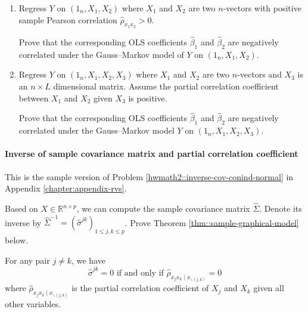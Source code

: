 \begin{enumerate}
\item
Regress $Y$ on $(1_n,X_1, X_2)$ where $X_1$ and $X_2$ are two $n$-vectors with positive sample Pearson correlation $\hat\rho_{x_1x_2} > 0$. 

Prove that the corresponding OLS coefficients $\hat{\beta}_1$ and $\hat{\beta}_2$ are negatively correlated under the Gauss--Markov model of $Y$ on $(1_n,X_1, X_2)$. 

\item
Regress $Y$ on $(1_n,X_1, X_2, X_3)$ where $X_1$ and $X_2$ are two $n$-vectors and $X_3$ is an $n\times L$ dimensional matrix. Assume the partial correlation coefficient between $X_1$ and $X_2$ given $X_3$ is positive.

Prove that the corresponding OLS coefficients $\hat{\beta}_1$ and $\hat{\beta}_2$ are negatively correlated under the Gauss--Markov model $Y$ on $(1_n,X_1, X_2, X_3)$. 
\end{enumerate}




\paragraph{Inverse of sample covariance matrix and partial correlation coefficient}\label{hw::7:inverse-samplecov-pcc}

This is the sample version of Problem \ref{hwmath2::inverse-cov-conind-normal} in Appendix \ref{chapter:appendix-rvs}.




Based on $X \in \mathbb{R}^{n\times p}$, we can compute the sample covariance matrix $\hat\Sigma$. Denote its inverse by $\hat\Sigma^{-1} = (\hat{\sigma}^{jk})_{1\leq j,k\leq p}$. 
Prove Theorem \ref{thm::sample-graphical-model} below. 


\begin{theorem}
\label{thm::sample-graphical-model}
For any pair $j\neq k$, we have 
$$
\hat{\sigma}^{jk} = 0 \text{ if and only if } \hat{\rho}_{x_jx_k\mid x_{\backslash (j,k)}} = 0
$$
where $\hat{\rho}_{x_jx_k\mid x_{\backslash (j,k)}} $ is the partial correlation coefficient of $X_j$ and $X_k$ given all other variables. 
\end{theorem}
 


